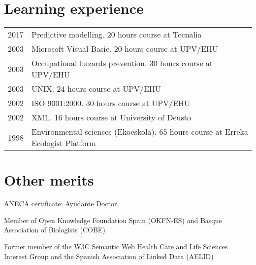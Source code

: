 \documentclass[11pt,fullpage]{article}
\renewenvironment{itemize}{
  \begin{list}{}{
    \setlength{\leftmargin}{1.5em}
  }
}{
  \end{list}
}
\begin{document}
\section*{Learning experience}
\begin{longtable}{p{0.5in}|p{5.5in}}
2017 & Predictive modelling. 20 hours course at Tecnalia \\
2003 & Microsoft Visual Basic. 20 hours course at UPV/EHU \\
2003 & Occupational hazards prevention.  30 hours course at UPV/EHU \\
2003 & UNIX. 24 hours course at UPV/EHU \\
2002 & ISO 9001:2000. 30 hours course at UPV/EHU \\
2002 & XML. 16 hours course at University of Deusto \\
1998 & Environmental sciences (Ekoeskola). 65 hours course at Erreka Ecologist Platform \\
\end{longtable}

\section*{Other merits}
\begin{itemize}
	\item ANECA certificate: Ayudante Doctor
	\item Member of Open Knowledge Foundation Spain (OKFN-ES) and Basque Association of Biologists (COBE)
	\item Former member of the W3C Semantic Web Health Care and Life Sciences Interest Group and the Spanish Association of Linked Data (AELID)
\end{itemize}
\end{document}
